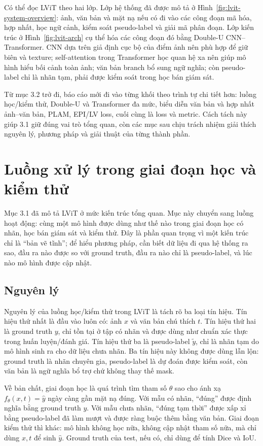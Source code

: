 Có thể đọc LViT theo hai lớp. Lớp hệ thống đã được mô tả ở Hình~\ref{fig:lvit-system-overview}: ảnh, văn bản và mặt nạ nếu có đi vào các công đoạn mã hóa, hợp nhất, học ngữ cảnh, kiểm soát pseudo-label và giải mã phân đoạn. Lớp kiến trúc ở Hình~\ref{fig:lvit-arch} cụ thể hóa các công đoạn đó bằng Double-U CNN--Transformer. CNN dựa trên giả định cục bộ của điểm ảnh nên phù hợp để giữ biên và texture; self-attention trong Transformer học quan hệ xa nên giúp mô hình hiểu bối cảnh toàn ảnh; văn bản branch bổ sung ngữ nghĩa; còn pseudo-label chỉ là nhãn tạm, phải được kiểm soát trong học bán giám sát.

Từ mục 3.2 trở đi, báo cáo mới đi vào từng khối theo trình tự chi tiết hơn: luồng học/kiểm thử, Double-U và Transformer đa mức, biểu diễn văn bản và hợp nhất ảnh--văn bản, PLAM, EPI/LV loss, cuối cùng là loss và metric. Cách tách này giúp 3.1 giữ đúng vai trò tổng quan, còn các mục sau chịu trách nhiệm giải thích nguyên lý, phương pháp và giải thuật của từng thành phần.

\section{Luồng xử lý trong giai đoạn học và kiểm thử}

Mục 3.1 đã mô tả LViT ở mức kiến trúc tổng quan. Mục này chuyển sang luồng hoạt động: cùng một mô hình được dùng như thế nào trong giai đoạn học có nhãn, học bán giám sát và kiểm thử. Đây là phần quan trọng vì một kiến trúc chỉ là ``bản vẽ tĩnh''; để hiểu phương pháp, cần biết dữ liệu đi qua hệ thống ra sao, đầu ra nào được so với ground truth, đầu ra nào chỉ là pseudo-label, và lúc nào mô hình được cập nhật.

\subsection*{Nguyên lý}

Nguyên lý của luồng học/kiểm thử trong LViT là tách rõ ba loại tín hiệu. Tín hiệu thứ nhất là đầu vào luôn có: ảnh \(x\) và văn bản chú thích \(t\). Tín hiệu thứ hai là ground truth \(y\), chỉ tồn tại ở tập có nhãn và được dùng như chuẩn xác thực trong huấn luyện/đánh giá. Tín hiệu thứ ba là pseudo-label \(\tilde{y}\), chỉ là nhãn tạm do mô hình sinh ra cho dữ liệu chưa nhãn. Ba tín hiệu này không được dùng lẫn lộn: ground truth là nhãn chuyên gia, pseudo-label là dự đoán được kiểm soát, còn văn bản là ngữ nghĩa bổ trợ chứ không thay thế mask.

Về bản chất, giai đoạn học là quá trình tìm tham số \(\theta\) sao cho ánh xạ \(f_\theta(x,t)=\hat{y}\) ngày càng gần mặt nạ đúng. Với mẫu có nhãn, ``đúng'' được định nghĩa bằng ground truth \(y\). Với mẫu chưa nhãn, ``đúng tạm thời'' được xấp xỉ bằng pseudo-label đã làm mượt và được ràng buộc thêm bằng văn bản. Giai đoạn kiểm thử thì khác: mô hình không học nữa, không cập nhật tham số nữa, mà chỉ dùng \(x,t\) để sinh \(\hat{y}\). Ground truth của test, nếu có, chỉ dùng để tính Dice và IoU.

